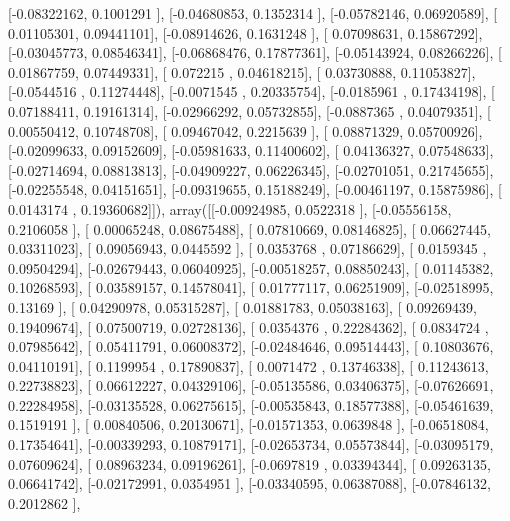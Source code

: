 \documentclass{article}
\begin{document}
       [-0.08322162,  0.1001291 ],
       [-0.04680853,  0.1352314 ],
       [-0.05782146,  0.06920589],
       [ 0.01105301,  0.09441101],
       [-0.08914626,  0.1631248 ],
       [ 0.07098631,  0.15867292],
       [-0.03045773,  0.08546341],
       [-0.06868476,  0.17877361],
       [-0.05143924,  0.08266226],
       [ 0.01867759,  0.07449331],
       [ 0.072215  ,  0.04618215],
       [ 0.03730888,  0.11053827],
       [-0.0544516 ,  0.11274448],
       [-0.0071545 ,  0.20335754],
       [-0.0185961 ,  0.17434198],
       [ 0.07188411,  0.19161314],
       [-0.02966292,  0.05732855],
       [-0.0887365 ,  0.04079351],
       [ 0.00550412,  0.10748708],
       [ 0.09467042,  0.2215639 ],
       [ 0.08871329,  0.05700926],
       [-0.02099633,  0.09152609],
       [-0.05981633,  0.11400602],
       [ 0.04136327,  0.07548633],
       [-0.02714694,  0.08813813],
       [-0.04909227,  0.06226345],
       [-0.02701051,  0.21745655],
       [-0.02255548,  0.04151651],
       [-0.09319655,  0.15188249],
       [-0.00461197,  0.15875986],
       [ 0.0143174 ,  0.19360682]]), array([[-0.00924985,  0.0522318 ],
       [-0.05556158,  0.2106058 ],
       [ 0.00065248,  0.08675488],
       [ 0.07810669,  0.08146825],
       [ 0.06627445,  0.03311023],
       [ 0.09056943,  0.0445592 ],
       [ 0.0353768 ,  0.07186629],
       [ 0.0159345 ,  0.09504294],
       [-0.02679443,  0.06040925],
       [-0.00518257,  0.08850243],
       [ 0.01145382,  0.10268593],
       [ 0.03589157,  0.14578041],
       [ 0.01777117,  0.06251909],
       [-0.02518995,  0.13169   ],
       [ 0.04290978,  0.05315287],
       [ 0.01881783,  0.05038163],
       [ 0.09269439,  0.19409674],
       [ 0.07500719,  0.02728136],
       [ 0.0354376 ,  0.22284362],
       [ 0.0834724 ,  0.07985642],
       [ 0.05411791,  0.06008372],
       [-0.02484646,  0.09514443],
       [ 0.10803676,  0.04110191],
       [ 0.1199954 ,  0.17890837],
       [ 0.0071472 ,  0.13746338],
       [ 0.11243613,  0.22738823],
       [ 0.06612227,  0.04329106],
       [-0.05135586,  0.03406375],
       [-0.07626691,  0.22284958],
       [-0.03135528,  0.06275615],
       [-0.00535843,  0.18577388],
       [-0.05461639,  0.1519191 ],
       [ 0.00840506,  0.20130671],
       [-0.01571353,  0.0639848 ],
       [-0.06518084,  0.17354641],
       [-0.00339293,  0.10879171],
       [-0.02653734,  0.05573844],
       [-0.03095179,  0.07609624],
       [ 0.08963234,  0.09196261],
       [-0.0697819 ,  0.03394344],
       [ 0.09263135,  0.06641742],
       [-0.02172991,  0.0354951 ],
       [-0.03340595,  0.06387088],
       [-0.07846132,  0.2012862 ],
\end{document}
